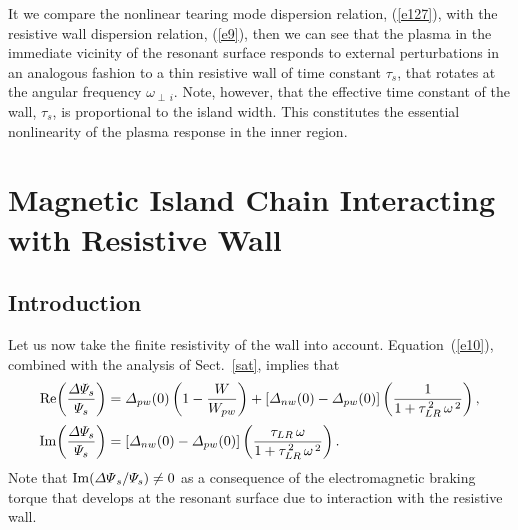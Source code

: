 \documentclass[12pt,prb,aps]{revtex4-1}
\begin{document}
It we compare the nonlinear tearing mode dispersion relation, (\ref{e127}), with the 
resistive wall dispersion relation, (\ref{e9}), then we can see that the plasma in the immediate vicinity of the
resonant surface responds to external perturbations in an analogous fashion to a thin resistive wall of
time constant $\tau_s$, that rotates at the angular frequency $\omega_{\perp\,i}$. Note, however, that
the effective time constant of the wall, $\tau_s$, is proportional to the island width. This constitutes  the essential
nonlinearity of the plasma response in the inner region. 

\section{Magnetic Island Chain Interacting with Resistive Wall}
\subsection{Introduction}
Let us now take the finite resistivity of the wall into account. Equation~(\ref{e10}), combined with the analysis
of Sect.~\ref{sat}, implies that
\begin{align}
{\rm Re}\!\left(\frac{{\mit\Delta}{\mit\Psi}_s}{{\mit\Psi}_s}\right)&={\mit\Delta}_{pw}(0)\left(1-\frac{W}{W_{pw}}\right) + [{\mit\Delta}_{nw}(0)-{\mit\Delta}_{pw}(0)]\left(\frac{1}{1+\tau_{LR}^{\,2}\,\omega^{\,2}}\right),\\[0.5ex]
{\rm Im}\!\left(\frac{{\mit\Delta}{\mit\Psi}_s}{{\mit\Psi}_s}\right)&=[{\mit\Delta}_{nw}(0)-{\mit\Delta}_{pw}(0)]\left(\frac{\tau_{LR}\,\omega}{1+\tau_{LR}^{\,2}\,\omega^{\,2}}\right).\label{e133}
\end{align}
Note that ${\rm Im}({\mit\Delta\Psi}_s/{\mit\Psi}_s)\neq 0$ as a consequence of the electromagnetic braking
torque that develops at the resonant surface due to interaction with the resistive wall. 
\end{document}
